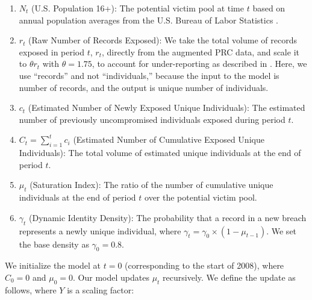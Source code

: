 \begin{enumerate}
    \item $N_t$ (U.S. Population 16+): The potential victim pool at time $t$ based on annual population averages from the U.S. Bureau of Labor Statistics \cite{FRED_Population}.
    
    \item $r_t$ (Raw Number of Records Exposed): We take the total volume of records exposed in period $t$, $r_t$, directly from the augmented PRC data, and scale it to $\theta r_t$ with $\theta = 1.75$, to account for under-reporting as described in \cite{Graves2018Should}.  Here, we use ``records'' and not ``individuals,'' because the input to the model is number of records, and the output is unique number of individuals. 

       
    \item $c_t$ (Estimated Number of Newly Exposed Unique Individuals): The estimated number of previously uncompromised individuals exposed during period $t$. 
        
    \item $C_t = \sum_{i=1}^{t} c_i$ (Estimated Number of Cumulative Exposed Unique Individuals): The total volume of estimated unique individuals at the end of period $t$. 
    
    \item $\mu_t$ (Saturation Index): The ratio of the number of cumulative unique individuals at the end of period $t$ over the potential victim pool. 
    
    \item $\gamma_t$ (Dynamic Identity Density): The probability that a record in a new breach represents a newly unique individual, where $\gamma_t = \gamma_0 \times (1-\mu_{t-1})$. We set the base density as $\gamma_0 = 0.8$.
\end{enumerate}

We initialize the model at $t=0$ (corresponding to the start of 2008), where $C_0 = 0$ and $\mu_0 = 0$. Our model updates $\mu_t$ recursively. We define the update as follows, where $Y$ is a scaling factor: 

